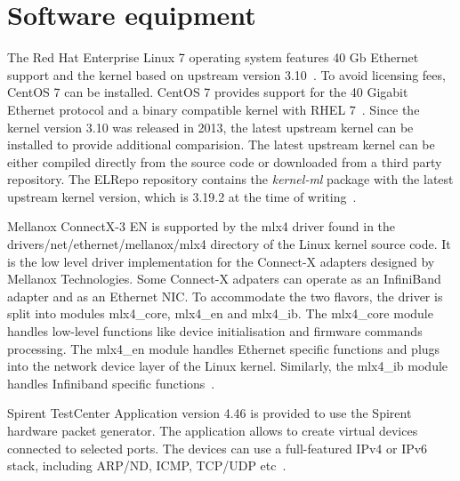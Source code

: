 
\section{Software equipment}\label{sec:analysis-software}
The Red Hat Enterprise Linux 7 operating system features 40 Gb Ethernet support and
the kernel based on upstream version 3.10~\cite{rhel-7-announce}.
To avoid licensing fees, CentOS 7 can be installed.
CentOS 7 provides support for the 40 Gigabit Ethernet protocol and a binary compatible kernel with RHEL 7~\cite{centos-7-announce}.
Since the kernel version 3.10 was released in 2013, the latest upstream kernel can be installed
to provide additional comparision.
The latest upstream kernel can be either compiled directly from the source code or downloaded from a third party repository.
The ELRepo repository contains the {\it{kernel-ml}} package
with the latest upstream kernel version, which is 3.19.2 at the time of writing~\cite{elrepo-kernel-ml}.

Mellanox ConnectX-3 EN is supported by the mlx4 driver found in the
drivers/net/ethernet/mellanox/mlx4 directory of the Linux kernel source code.
It is the low level driver implementation for the Connect-X adapters designed by Mellanox Technologies.
Some Connect-X adpaters can operate as an InfiniBand adapter and as an Ethernet NIC.
To accommodate the two flavors, the driver is split into modules mlx4\_core, mlx4\_en and mlx4\_ib.
The mlx4\_core module handles low-level functions like device initialisation and firmware commands processing.
The mlx4\_en module handles Ethernet specific functions and
plugs into the network device layer of the Linux kernel.
Similarly, the mlx4\_ib module handles Infiniband specific functions~\cite{mellanox-user-manual}.

Spirent TestCenter Application version 4.46 is provided to use the Spirent hardware packet generator.
The application allows to create virtual devices connected to selected ports.
The devices can use a full-featured IPv4 or IPv6 stack, including ARP/ND, ICMP, TCP/UDP etc~\cite{spirent-app}.
